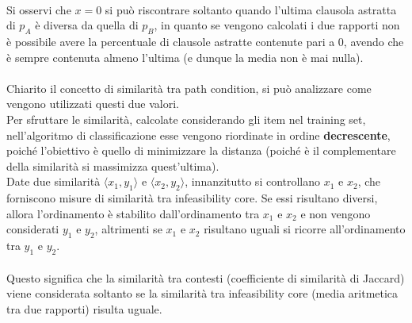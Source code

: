\documentclass[a4paper, 12pt, oneside]{book}
\theoremstyle{normal}
\begin{document}
\noindent \\ Si osservi che $x = 0$ si può riscontrare soltanto quando l'ultima clausola astratta di $p_A$ è diversa da quella di $p_B$, in quanto se vengono calcolati i due rapporti non è possibile avere la percentuale di clausole astratte contenute pari a 0, avendo che è sempre contenuta almeno l'ultima (e dunque la media non è mai nulla).
\\ \\ Chiarito il concetto di similarità tra path condition, si può analizzare come vengono utilizzati questi due valori. \\ Per sfruttare le similarità, calcolate considerando gli item nel training set, nell'algoritmo di classificazione esse vengono riordinate in ordine \textbf{decrescente}, poiché l'obiettivo è quello di minimizzare la distanza (poiché è il complementare della similarità si massimizza quest'ultima). \\ Date due similarità $\langle x_1, y_1 \rangle$ e $\langle x_2, y_2 \rangle$, innanzitutto si controllano $x_1$ e $x_2$, che forniscono misure di similarità tra infeasibility core. Se essi risultano diversi, allora l'ordinamento è stabilito dall'ordinamento tra $x_1$ e $x_2$ e non vengono considerati $y_1$ e $y_2$, altrimenti se $x_1$ e $x_2$ risultano uguali si ricorre all'ordinamento tra $y_1$ e $y_2$. \\ \\ Questo significa che la similarità tra contesti (coefficiente di similarità di Jaccard) viene considerata soltanto se la similarità tra infeasibility core (media aritmetica tra due rapporti) risulta uguale.
\end{document}
